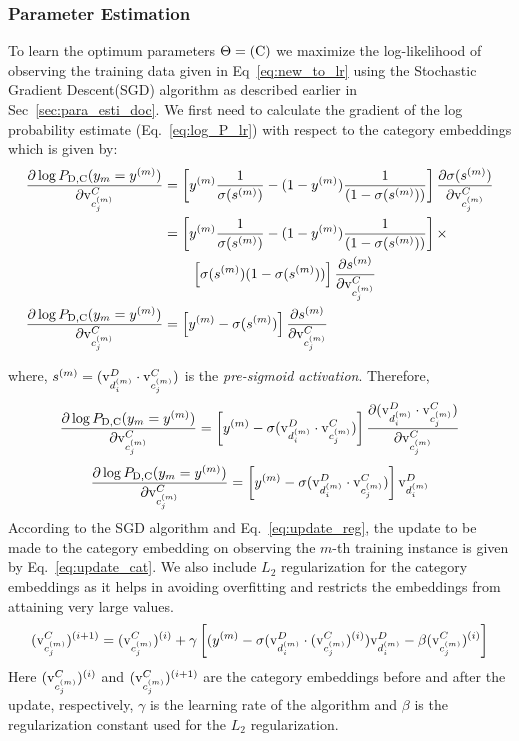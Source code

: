 \subsubsection{Parameter Estimation}

To learn the optimum parameters $\Theta=(\mathrm{C})$ we maximize the log-likelihood of observing the training data given in Eq~\ref{eq:new_to_lr} using the Stochastic Gradient Descent(SGD) algorithm as described earlier in Sec~\ref{sec:para_esti_doc}. We first need to calculate the gradient of the log probability estimate (Eq.~\ref{eq:log_P_lr}) with respect to the category embeddings which is given by:
\begin{align}
\frac{\partial \log P_{\mathrm{D}, \mathrm{C}}(y_{m}=y^{(m)})} {\partial \mathrm{v}^{C}_{c^{(m)}_{j}}} &= \left[ y^{(m)}\frac{1}{\sigma(s^{(m)})} - (1-y^{(m)})\frac{1}{(1 - \sigma(s^{(m)}))}\right] \frac{\partial \sigma(s^{(m)})}{\partial \mathrm{v}^{C}_{c^{(m)}_{j}}} \\
&= \left[ y^{(m)}\frac{1}{\sigma(s^{(m)})} - (1-y^{(m)})\frac{1}{(1 - \sigma(s^{(m)}))}\right] \times\notag\\&\qquad\left[\sigma(s^{(m)})(1-\sigma(s^{(m)}))\right]\frac{\partial s^{(m)}}{\partial \mathrm{v}^{C}_{c^{(m)}_{j}}} \\
\frac{\partial \log P_{\mathrm{D}, \mathrm{C}}(y_{m}=y^{(m)})} {\partial \mathrm{v}^{C}_{c^{(m)}_{j}}} &= \left[ y^{(m)} - \sigma(s^{(m)})\right] \frac{\partial s^{(m)}}{\partial \mathrm{v}^{C}_{c^{(m)}_{j}}}
\end{align}

where, $s^{(m)} = (\mathrm{v}^{D}_{d^{(m)}_{i}}\cdot \mathrm{v}^{C}_{c^{(m)}_{j}})$ is the \emph{pre-sigmoid activation}. Therefore,
\begin{equation}
\frac{\partial \log P_{\mathrm{D}, \mathrm{C}}(y_{m}=y^{(m)})} {\partial \mathrm{v}^{C}_{c^{(m)}_{j}}} = \left[ y^{(m)} - \sigma(\mathrm{v}^{D}_{d^{(m)}_{i}}\cdot \mathrm{v}^{C}_{c^{(m)}_{j}})\right] \frac{\partial (\mathrm{v}^{D}_{d^{(m)}_{i}}\cdot \mathrm{v}^{C}_{c^{(m)}_{j}})}{\partial \mathrm{v}^{C}_{c^{(m)}_{j}}}
\end{equation}
\begin{equation}
\label{eq:grad_c}
\frac{\partial \log P_{\mathrm{D}, \mathrm{C}}(y_{m}=y^{(m)})} {\partial \mathrm{v}^{C}_{c^{(m)}_{j}}} = \left[ y^{(m)} - \sigma(\mathrm{v}^{D}_{d^{(m)}_{i}}\cdot \mathrm{v}^{C}_{c^{(m)}_{j}})\right] \mathrm{v}^{D}_{d^{(m)}_{i}}
\end{equation}
According to the SGD algorithm and Eq.~\ref{eq:update_reg}, the update to be made to the category embedding on observing the $m$-th training instance is given by Eq.~\ref{eq:update_cat}. We also include $L_{2}$
regularization for the category embeddings as it helps in avoiding overfitting and restricts the embeddings from attaining very large values.
\begin{equation}
\label{eq:update_cat}
(\mathrm{v}^{C}_{c^{(m)}_{j}})^{(i+1)} = (\mathrm{v}^{C}_{c^{(m)}_{j}})^{(i)} + \gamma \left[ ( y^{(m)} - \sigma(\mathrm{v}^{D}_{d^{(m)}_{i}}\cdot (\mathrm{v}^{C}_{c^{(m)}_{j}})^{(i)}) \mathrm{v}^{D}_{d^{(m)}_{i}} -\beta(\mathrm{v}^{C}_{c^{(m)}_{j}})^{(i)} \right]
\end{equation}
Here $(\mathrm{v}^{C}_{c^{(m)}_{j}})^{(i)}$ and $(\mathrm{v}^{C}_{c^{(m)}_{j}})^{(i+1)}$ are the category embeddings before and after the update, respectively, $\gamma$ is the learning rate of the algorithm and $\beta$ is the regularization constant used for the $L_{2}$ regularization. 

